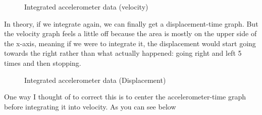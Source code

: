 \documentclass[12pt]{article}
\begin{document}
\begin{figure}[H]
    \caption{Integrated accelerometer data (velocity)}
    \label{fig:vel}
\end{figure}
In theory, if we integrate again, we can finally get a displacement-time graph. But the velocity graph feels a little off because the area is mostly on the upper side of the x-axis, meaning if we were to integrate it, the displacement would start going towards the right rather than what actually happened: going right and left 5 times and then stopping. 
\begin{figure}[H]
    \caption{Integrated accelerometer data (Displacement)}
    \label{fig:displ}
\end{figure}

One way I thought of to correct this is to center the accelerometer-time graph before integrating it into velocity. As you can see below
\end{document}
